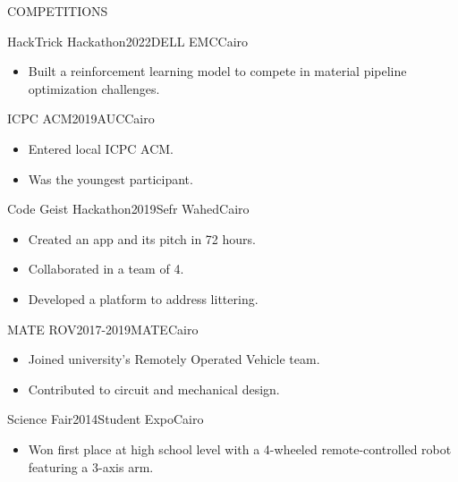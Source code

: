 \documentclass{resume}
\begin{document}
\hfill
\begin{minipage}[t]{0.49\textwidth}

	\begin{rsection}{\MakeUppercase{competitions}}{}

		\begin{rcontent}[80pt][\faBuilding]{HackTrick Hackathon}{2022}{DELL EMC}{Cairo}
			\begin{itemize}
				\item Built a reinforcement learning model to compete in material pipeline optimization challenges.
			\end{itemize}
		\end{rcontent}
		\divider
		\begin{rcontent}[80pt][\faBuilding]{ICPC ACM}{2019}{AUC}{Cairo}
			\begin{itemize}
				\item Entered local ICPC ACM.
				\item Was the youngest participant.
			\end{itemize}
		\end{rcontent}
		\divider
		\begin{rcontent}[80pt][\faBuilding]{Code Geist Hackathon}{2019}{Sefr Wahed}{Cairo}
			\begin{itemize}
				\item Created an app and its pitch in 72 hours.
				\item Collaborated in a team of 4.
				\item Developed a platform to address littering.
			\end{itemize}
		\end{rcontent}
		\divider
		\begin{rcontent}[80pt][\faBuilding]{MATE ROV}{2017-2019}{MATE}{Cairo}
			\begin{itemize}
				\item Joined university's Remotely Operated Vehicle team.
				\item Contributed to circuit and mechanical design.
			\end{itemize}
		\end{rcontent}
		\divider
		\begin{rcontent}[80pt][\faBuilding]{Science Fair}{2014}{Student Expo}{Cairo}
			\begin{itemize}
				\item Won first place at high school level with a 4-wheeled remote-controlled robot featuring a 3-axis arm.
			\end{itemize}
		\end{rcontent}
	\end{rsection}


\end{minipage}
\end{document}
